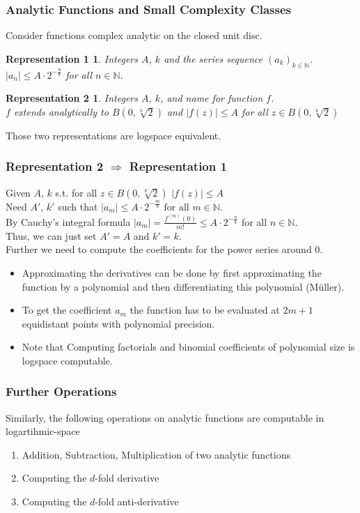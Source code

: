 \documentclass[xcolor=pdftex,dvipsnames,table]{beamer}
\newcommand{\N}{\ensuremath{\mathbb{N}}}
\newcommand{\abs}[1]{\left|#1\right|}
\newtheorem{representation1}{Representation 1}
\newtheorem{representation2}{Representation 2}
\begin{document}
\begin{frame}
\frametitle{Analytic Functions and Small Complexity Classes}
  Consider functions complex analytic on the closed unit disc.
\begin{representation1}
  Integers $A$, $k$ and the series sequence $(a_k)_{k \in \N}$.\\
  $\abs{a_n} \leq A \cdot 2^{-\frac{n}{k}}$ for all $n \in \N$.
\end{representation1}
\begin{representation2}
  Integers $A$, $k$, and name for function $f$.\\
  $f$ extends analytically to $B(0, \sqrt[k]{2})$ and $\abs{f(z)} \leq A$ for all $z \in B(0, \sqrt[k]{2})$
\end{representation2}
Those two representations are logspace equivalent.
\end{frame}
\begin{frame}
\frametitle{Representation 2 $\Rightarrow$ Representation 1}
Given $A$, $k$ s.t. for all $z \in B(0, \sqrt[k']{2})$
$\abs{f(z)} \leq A$\\
\pause
Need $A'$, $k'$ such that $\abs{a_m} \leq A \cdot 2^{-\frac{m}{k}} \text{ for all } m \in \N.$\\
\pause
By Cauchy's integral formula $\abs{a_m} = \frac{f^{(m)}(0)}{m!} \leq A \cdot 2^{-\frac{n}{k}}$ for all $n \in \N$. \\
Thus, we can just set $A' = A$ and $k' = k$.\\
\pause
Further we need to compute the coefficients for the power series around $0$.\\
\begin{itemize}[<+->]
\item Approximating the derivatives can be done by first approximating the function by a polynomial and then differentiating this polynomial (M\"{u}ller).
\item To get the coefficient $a_m$  the function has to be evaluated at $2m+1$ equidistant points with polynomial precision.
\item Note that Computing factorials and binomial coefficients of polynomial size is logspace computable.
\end{itemize}
\end{frame}
\begin{frame}
\frametitle{Further Operations}
  \begin{tcolorbox}[colback=yellow!5,title=Logspace computable operations,colframe=blue!75!black]

  Similarly, the following operations on analytic functions are computable in logartihmic-space
  \begin{enumerate}[<+->]
    \item Addition, Subtraction, Multiplication of two analytic functions
    \item Computing the $d$-fold derivative
    \item Computing the $d$-fold anti-derivative
   \end{enumerate}
  \end{tcolorbox}
\end{frame}
\end{document}
